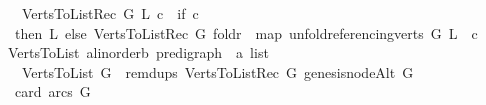 \begin{isabellebody}
\ \ \ {\isachardoublequoteopen}Verts{\isacharunderscore}{\kern0pt}To{\isacharunderscore}{\kern0pt}List{\isacharunderscore}{\kern0pt}Rec\ G\ L\ c\ {\isacharequal}{\kern0pt}\ {\isacharparenleft}{\kern0pt}if\ {\isacharparenleft}{\kern0pt}c\ {\isasymle}\ {}{\isacharparenright}{\kern0pt}\isanewline
\ \ then\ L\ else\ Verts{\isacharunderscore}{\kern0pt}To{\isacharunderscore}{\kern0pt}List{\isacharunderscore}{\kern0pt}Rec\ G\ {\isacharparenleft}{\kern0pt}foldr\ {\isacharparenleft}{\kern0pt}{\isacharat}{\kern0pt}{\isacharparenright}{\kern0pt}\ {\isacharparenleft}{\kern0pt}map\ {\isacharparenleft}{\kern0pt}unfold{\isacharunderscore}{\kern0pt}referencing{\isacharunderscore}{\kern0pt}verts\ G{\isacharparenright}{\kern0pt}\ L{\isacharparenright}{\kern0pt}\ {\isacharbrackleft}{\kern0pt}{\isacharbrackright}{\kern0pt}{\isacharparenright}{\kern0pt}\ {\isacharparenleft}{\kern0pt}c\ {\isacharminus}{\kern0pt}\ {}{\isacharparenright}{\kern0pt}{\isacharparenright}{\kern0pt}{\isachardoublequoteclose}\isanewline
\ \isanewline
{}\isamarkupfalse%
\ Verts{\isacharunderscore}{\kern0pt}To{\isacharunderscore}{\kern0pt}List{\isacharcolon}{\kern0pt}{\isacharcolon}{\kern0pt}\ {\isachardoublequoteopen}{\isacharparenleft}{\kern0pt}{\isacharprime}{\kern0pt}a{\isacharcolon}{\kern0pt}{\isacharcolon}{\kern0pt}linorder{\isacharcomma}{\kern0pt}{\isacharprime}{\kern0pt}b{\isacharparenright}{\kern0pt}\ pre{\isacharunderscore}{\kern0pt}digraph\ {\isasymRightarrow}\ {\isacharprime}{\kern0pt}a\ list{\isachardoublequoteclose}\isanewline
\ \ \ {\isachardoublequoteopen}Verts{\isacharunderscore}{\kern0pt}To{\isacharunderscore}{\kern0pt}List\ G\ {\isacharequal}{\kern0pt}\ remdups\ {\isacharparenleft}{\kern0pt}Verts{\isacharunderscore}{\kern0pt}To{\isacharunderscore}{\kern0pt}List{\isacharunderscore}{\kern0pt}Rec\ G\ {\isacharbrackleft}{\kern0pt}genesis{\isacharunderscore}{\kern0pt}nodeAlt\ G{\isacharbrackright}{\kern0pt}\ \isanewline
\ \ {\isacharparenleft}{\kern0pt}card\ {\isacharparenleft}{\kern0pt}arcs\ G{\isacharparenright}{\kern0pt}{\isacharparenright}{\kern0pt}{\isacharparenright}{\kern0pt}{\isachardoublequoteclose}\isanewline
%
\isadelimtheory
\isanewline
%
\endisadelimtheory
%
\isatagtheory
{}\isamarkupfalse%
%
\endisatagtheory
{\isafoldtheory}%
%
\isadelimtheory
%
\endisadelimtheory
%
\end{isabellebody}%
\endinput
